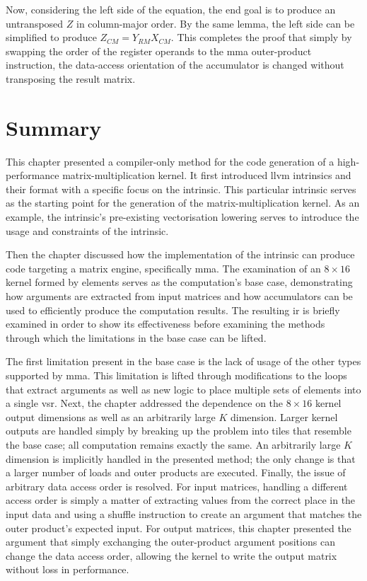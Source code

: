 \documentclass[\main/thesis.tex]{subfiles}
\begin{document}
Now, considering the left side of the equation, the end goal is to produce an untransposed $Z$ in column-major order.
By the same lemma, the left side can be simplified to produce $Z_{CM} = Y_{RM}X_{CM}$.
This completes the proof that simply by swapping the order of the register operands to the \gls{mma} outer-product instruction, the data-access orientation of the accumulator is changed without transposing the result matrix.

\section{Summary}
This chapter presented a compiler-only method for the code generation of a high-performance matrix-multiplication kernel.
It first introduced \gls{llvm} intrinsics and their format with a specific focus on the  intrinsic.
This particular intrinsic serves as the starting point for the generation of the matrix-multiplication kernel.
As an example, the intrinsic's pre-existing vectorisation lowering serves to introduce the usage and constraints of the intrinsic.

Then the chapter discussed how the implementation of the intrinsic can produce code targeting a \gls{matrix engine}, specifically \gls{mma}.
The examination of an $8 \times 16$ kernel formed by  elements serves as the computation's base case, demonstrating how arguments are extracted from input matrices and how accumulators can be used to efficiently produce the computation results.
The resulting \gls{ir} is briefly examined in order to show its effectiveness before examining the methods through which the limitations in the base case can be lifted.

The first limitation present in the base case is the lack of usage of the other types supported by \gls{mma}.
This limitation is lifted through modifications to the loops that extract arguments as well as new logic to place multiple sets of elements into a single \gls{vsr}.
Next, the chapter addressed the dependence on the $8 \times 16$ kernel output dimensions as well as an arbitrarily large $K$ dimension.
Larger kernel outputs are handled simply by breaking up the problem into tiles that resemble the base case; all computation remains exactly the same.
An arbitrarily large $K$ dimension is implicitly handled in the presented method; the only change is that a larger number of loads and outer products are executed.
Finally, the issue of arbitrary data access order is resolved.
For input matrices, handling a different access order is simply a matter of extracting values from the correct place in the input data and using a shuffle instruction to create an argument that matches the outer product's expected input.
For output matrices, this chapter presented the argument that simply exchanging the outer-product argument positions can change the data access order, allowing the kernel to write the output matrix without loss in performance.
\end{document}
